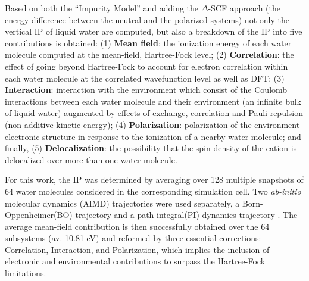 \documentclass[notitlepage,12pt]{report}
\begin{document}
	Based on both  the “Impurity Model” and adding the $\Delta$-SCF approach\supercite{bagus1965self,waskom2017mwaskom} (the energy difference between the neutral and the polarized systems) not only the vertical IP of liquid water are computed, but also a breakdown of the IP into five contributions is obtained:  (1) \textbf{Mean field}: the ionization energy of each water molecule computed at the mean-field, Hartree-Fock level; (2) \textbf{Correlation}: the effect of going beyond Hartree-Fock to account for electron correlation within each water molecule at the correlated wavefunction level as well as DFT; (3) \textbf{Interaction}: interaction with the environment which consist of the Coulomb interactions between each water molecule and their environment (an infinite bulk of liquid water) augmented by effects of exchange, correlation and Pauli repulsion (non-additive kinetic energy); (4) \textbf{Polarization}: polarization of the environment electronic structure in response to the ionization of a nearby water molecule; and finally, (5) \textbf{Delocalization}: the possibility that the spin density of the cation is delocalized over more than one water molecule.
	
	For this work, the IP was determined by averaging over 128 multiple snapshots of 64 water molecules considered in the corresponding simulation cell. Two \textit{ab-initio} molecular dynamics (AIMD) trajectories were used separately, a Born-Oppenheimer(BO) trajectory and a path-integral(PI) dynamics trajectory \supercite{gaiduk2018electron}. The average mean-field contribution is then successfully obtained over the 64 subsystems (av. 10.81 eV) and reformed by three essential corrections: Correlation, Interaction, and Polarization, which implies the inclusion of electronic and environmental contributions to surpass the Hartree-Fock limitations. 
	
\end{document}
